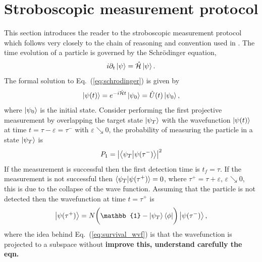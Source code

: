 \documentclass[12pt]{article}
\numberwithin{equation}{section}
\renewcommand{\H}{\mathcal{\hat{H}}}
\newcommand{\1}{\mathbb{1}}
\newcommand{\state}{\ket{\psi_T}}
\newcommand{\projection}{\bra{\psi_T}}
\begin{document}
\section{Stroboscopic measurement protocol}\label{sec:stroboscopic_measurement_protocol}
This section introduces the reader to the stroboscopic measurement protocol which follows very closely to the chain of reasoning and convention used in \cite{barkai,wang2023quantum,}.
The time evolution of a particle is governed by the Schrödinger equation,
\begin{equation}\label{eq:schrodinger}
    i\partial_t\ket{\psi}=\H\ket{\psi}.
\end{equation}
The formal solution to Eq.~(\ref{eq:schrodinger}) is given by
\begin{equation}\label{eq:sol_schrodinger}
\ket{\psi(t)}=e^{-i\H t}\ket{\psi_0}=\hat{U}(t)\ket{\psi_0}, 
\end{equation}
where $\ket{\psi_0}$ is the initial state. Consider performing the first projective measurement by overlapping the target state $\state$ with the wavefunction $\ket{\psi(t)}$ at time $t=\tau-\varepsilon=\tau^-$ with $\varepsilon\searrow0$, the probability of measuring the particle in a state $\state$ is 
\begin{equation}
    P_1=\abs{\projection\ket{\psi(\tau^-)}}^2
\end{equation}
If the measurement is successful then the first detection time is $t_f=\tau$. If the measurement is not successful then $\projection\ket{\psi(\tau^+)}=0$, where $\tau^+=\tau+\varepsilon$, $\varepsilon\searrow0$, this is due to the collapse of the wave function. Assuming that the particle is not detected then the wavefunction at time $t=\tau^+$ is
\begin{equation}\label{eq:survival_wvf}
    \ket{\psi(\tau^+)}=N\biggl(\1-\state\bra{\phi} \biggr)\ket{\psi(\tau^-)},
\end{equation}
where the idea behind Eq.~(\ref{eq:survival_wvf}) is that the wavefunction is projected to a subspace without \textbf{improve this, understand carefully the eqn.}
\end{document}
